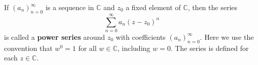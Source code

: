 If $(a_n)_{n=0}^{\infty}$ is a sequence in $\mathbb{C}$ and $z_0$ a fixed element of $\mathbb{C}$, then the series
$$\sum_{n=0}^{\infty} a_n (z - z_0)^n$$
is called a \textbf{power series} around $z_0$ with coefficients $(a_n)_{n=0}^{\infty}$. Here we use the convention that $w^0 = 1$ for all $w \in \mathbb{C}$, including $w = 0$. The series is defined for each $z \in \mathbb{C}$.
